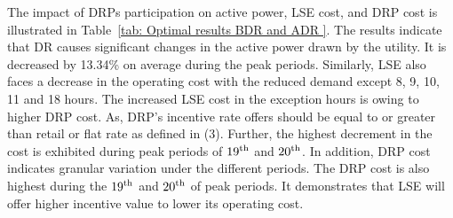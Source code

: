 \documentclass[journal]{IEEEtran}
\begin{document}
The impact of DRPs participation on active power, LSE cost, and DRP cost is illustrated in Table~\ref{tab: Optimal results BDR and ADR  }. The results indicate that DR causes significant changes in the active power drawn by the utility. It is decreased by 13.34\% on average during the peak periods. Similarly, LSE also faces a decrease in the operating cost with the reduced demand except 8, 9, 10, 11 and 18 hours. The increased LSE cost in the exception hours is owing to higher DRP cost. As, DRP’s incentive rate offers should be equal to or greater than retail or flat rate as defined in (3). Further, the highest decrement in the cost is exhibited during peak periods of $\rm{19}^{\rm{th}}$ and $\rm{20}^{\rm{th}}$. In addition, DRP cost indicates granular variation under the different periods. The DRP cost is also highest during the $\rm{19}^{\rm{th}}$ and $\rm{20}^{\rm{th}}$ of peak periods. It demonstrates that LSE will offer higher incentive value to lower its operating cost.    
\end{document}
